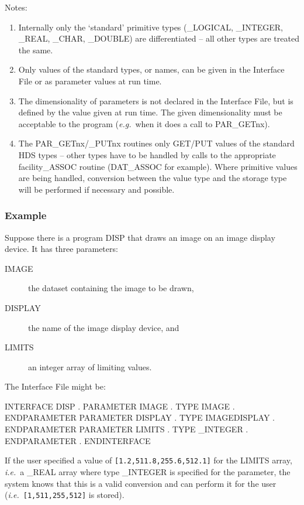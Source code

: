 \documentclass[twoside,11pt,nolof]{starlink}
\begin{document}
Notes:
\begin{enumerate}
\item Internally only the `standard' primitive types (\_LOGICAL, \_INTEGER,
\_REAL, \_CHAR, \_DOUBLE) are differentiated -- all other types are treated
the same.
\item Only values of the standard types, or names, can be given in the
Interface File or as parameter values at run time.
\item The dimensionality of parameters is not declared in the
Interface File, but is defined by the value given at run time.
The given dimensionality must be acceptable to the program
(\emph{e.g.}\ when it does a call to PAR\_GETnx).
\item The PAR\_GETnx/\_PUTnx routines only GET/PUT values of the
standard HDS types --
other types have to be handled by calls to the appropriate facility\_ASSOC
routine (DAT\_ASSOC for example).
Where primitive values are being handled, conversion between the value type
and the storage type will be performed if necessary and possible.
\end{enumerate}

\subsubsection*{Example}
Suppose there is a program DISP that draws an image on an
image display device.
It has three parameters:
\begin{description}
\item[IMAGE] the dataset containing the image to be drawn,
\item[DISPLAY] the name of the image display device, and
\item[LIMITS] an integer array of limiting values.
\end{description}
The Interface File might be:
\begin{terminalv}
INTERFACE DISP
   .
   PARAMETER IMAGE
         .
      TYPE IMAGE
         .
   ENDPARAMETER
   PARAMETER DISPLAY
         .
      TYPE IMAGEDISPLAY
         .
   ENDPARAMETER
   PARAMETER LIMITS
         .
      TYPE _INTEGER
         .
   ENDPARAMETER
      .
ENDINTERFACE
\end{terminalv}
If the user specified a value of \texttt{[1.2,511.8,255.6,512.1]}
for the LIMITS array, \emph{i.e.}\ a \_REAL array where type \_INTEGER is
specified for the parameter, the system knows that this is a valid
conversion and can perform it for the user (\emph{i.e.}\ \texttt{[1,511,255,512]}
is stored).
\end{document}
